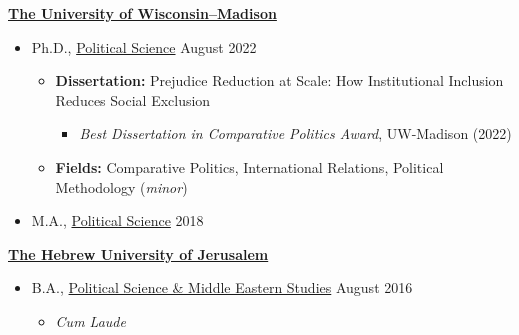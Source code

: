 \documentclass[11pt]{article}
\newenvironment{outerlist}[1][\enskip\textbullet]%
        {\begin{itemize}[#1,leftmargin=*]}{\end{itemize}%
         \vspace{-.6\baselineskip}}
\newenvironment{innerlist}[1][\enskip\textbullet]%
        {\begin{itemize}[#1,leftmargin=*,parsep=0pt,itemsep=0pt,topsep=0pt,partopsep=0pt]}
        {\end{itemize}}
\begin{document}
\href{http://polisci.wisc.edu}{\textbf{The University of Wisconsin--Madison}}
\begin{outerlist}

\item[] Ph.D.,
        \href{http://polisci.wisc.edu}
             {Political Science}
           \hfill August 2022
        \begin{innerlist}
        \item \textbf{Dissertation:} Prejudice Reduction at Scale: How Institutional Inclusion Reduces Social Exclusion  
                 \begin{itemize}[label=$\star$]
		 \item \emph{Best Dissertation in Comparative Politics Award}, UW-Madison (2022)
		\end{itemize}      
        \item \textbf{Fields:} Comparative Politics, International Relations, Political Methodology (\emph{minor})
        \end{innerlist}


\item[] M.A.,
        \href{http://polisci.wisc.edu}
             {Political Science} \hfill {2018}
\end{outerlist}  \vspace{.1in}

\href{http://new.huji.ac.il/en}{\textbf{The Hebrew University of Jerusalem}}
\begin{outerlist}
\item[] B.A.,
        \href{https://en.politics.huji.ac.il/}
             {Political Science \& Middle Eastern Studies} \hfill {August 2016}
        \begin{innerlist}
        \item \emph{Cum Laude}
        \end{innerlist}

\end{outerlist}
\end{document}
